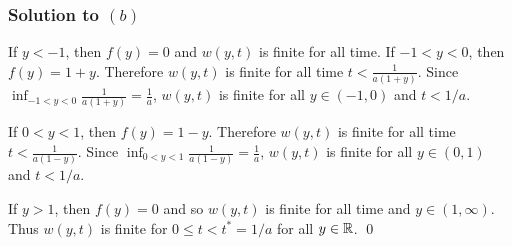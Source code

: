\subsubsection*{Solution to $(b)$}
If $y < -1$, then $f(y) = 0$ and $w(y, t)$ is finite for all time. If $-1 < y < 0$, then $f(y) = 1 + y$. Therefore
$w(y, t)$ is finite for all time $t < \frac{1}{a(1 + y)}$. Since $\inf_{-1 < y < 0}\frac{1}{a(1 + y)} = \frac{1}{a}$,
$w(y, t)$ is finite for all $y \in (-1, 0)$ and $t < 1/a$.

If $0 < y < 1$, then $f(y) = 1 - y$. Therefore $w(y, t)$ is finite for all time $t < \frac{1}{a(1 - y)}$. Since $\inf_{0 < y < 1}\frac{1}{a(1 - y)} = \frac{1}{a}$,
$w(y, t)$ is finite for all $y \in (0, 1)$ and $t < 1/a$.

If $y > 1$, then $f(y) = 0$ and so $w(y, t)$ is finite for all time and $y \in (1, \infty)$.
Thus $w(y, t)$ is finite for $0 \leq t < t^{\ast} = 1/a$ for all $y \in \mathbb{R}$.
\hfill\qed


